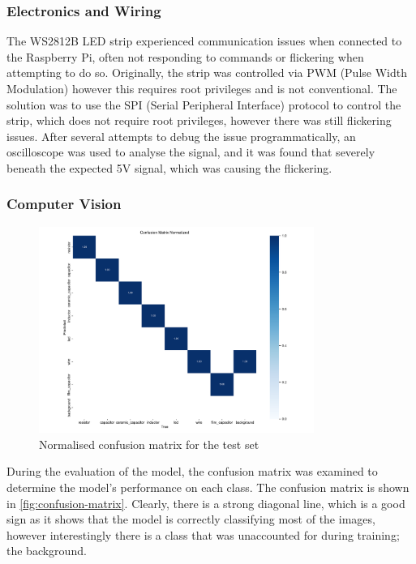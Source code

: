 \subsubsection{Electronics and Wiring}
The WS2812B LED strip experienced communication issues when connected to the Raspberry Pi, often not responding to commands or flickering when attempting to do so. Originally, the strip was controlled via PWM (Pulse Width Modulation) however this requires root privileges and is not conventional. The solution was to use the SPI (Serial Peripheral Interface) protocol to control the strip, which does not require root privileges, however there was still flickering issues. After several attempts to debug the issue programmatically, an oscilloscope was used to analyse the signal, and it was found that severely beneath the expected 5V signal, which was causing the flickering.





\subsubsection{Computer Vision}

\begin{figure}[H]
    \centering
    \includegraphics[width=0.8\textwidth]{imgs/graphs/confusion_matrix_test.png}
    \caption{Normalised confusion matrix for the test set}
    \label{fig:confusion-matrix}
  \end{figure}

During the evaluation of the model, the confusion matrix was examined to determine the model's performance on each class. The confusion matrix is shown in \autoref{fig:confusion-matrix}. Clearly, there is a strong diagonal line, which is a good sign as it shows that the model is correctly classifying most of the images, however interestingly there is a class that was unaccounted for during training; the background. 

